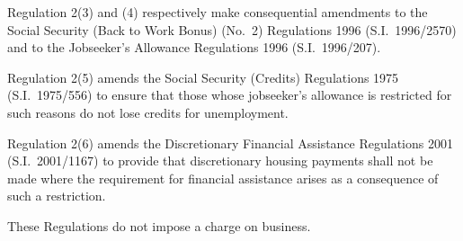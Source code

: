 \documentclass[12pt,a4paper]{article}
\begin{document}
Regulation 2(3) and (4) respectively make consequential amendments to the Social Security (Back to Work Bonus) (No.\ 2) Regulations 1996 (S.I.\ 1996/2570) and to the Jobseeker’s Allowance Regulations 1996 (S.I.\ 1996/207).

Regulation 2(5) amends the Social Security (Credits) Regulations 1975 (S.I.\ 1975/556) to ensure that those whose jobseeker’s allowance is restricted for such reasons do not lose credits for unemployment.

Regulation 2(6) amends the Discretionary Financial Assistance Regulations 2001 (S.I.\ 2001/1167) to provide that discretionary housing payments shall not be made where the requirement for financial assistance arises as a consequence of such a restriction.

These Regulations do not impose a charge on business. 
\end{document}
